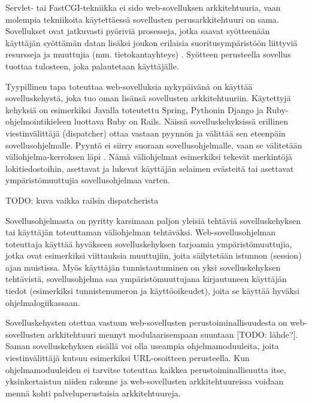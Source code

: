 Servlet- tai FastCGI-tekniikka ei sido web-sovelluksen arkkitehtuuria, vaan molempia tekniikoita käytettäessä sovellusten perusarkkitehtuuri on sama. Sovellukset ovat jatkuvasti pyöriviä prosesseja, jotka saavat syötteenään käyttäjän syöttämän datan lisäksi joukon erilaisia suoritusympäristöön liittyviä resursseja ja muuttujia (mm. tietokantayhteys) \cite{uml}. Syötteen perusteella sovellus tuottaa tulosteen, joka palautetaan käyttäjälle.

Tyypillinen tapa toteuttaa web-sovelluksia nykypäivänä on käyttää sovelluskehystä, joka tuo oman lisänsä sovellusten arkkitehtuuriin. Käytettyjä kehyksiä on esimerkiksi Javalla toteutettu Spring, Pythonin Django ja Ruby-ohjelmointikieleen luottava Ruby on Rails. Näissä sovelluskehyksissä erillinen viestinvälittäjä (dispatcher) ottaa vastaan pyynnön ja välittää sen eteenpäin sovellusohjelmalle. Pyyntö ei siirry suoraan sovellusohjelmalle, vaan se välitetään väliohjelma-kerroksen läpi \cite{ruby2011agile}. Nämä väliohjelmat esimerkiksi tekevät merkintöjä lokitiedostoihin, asettavat ja lukevat käyttäjän selaimen evästeitä tai asettavat ympäristömuuttujia sovellusohjelmaa varten.

TODO: kuva vaikka railsin dispatcherista

Sovellusohjelmasta on pyritty karsimaan paljon yleisiä tehtäviä sovelluskehyksen tai käyttäjän toteuttaman väliohjelman tehtäväksi. Web-sovellusohjelman toteuttaja käyttää hyväkseen sovelluskehyksen tarjoamia ympäristömuuttujia, jotka ovat esimerkiksi viittauksia muuttujiin, joita säilytetään istunnon (session) ajan muistissa. Myös käyttäjän tunnistautuminen on yksi sovelluskehyksen tehtävistä, sovellusohjelma saa ympäristömuuttujana kirjautuneen käyttäjän tiedot (esimerkiksi tunnistenumeron ja käyttöoikeudet), joita se käyttää hyväksi ohjelmalogiikassaan.

Sovelluskehysten otettua vastuun web-sovellusten perustoiminallisuudesta on web-sovellusten arkkitehtuuri mennyt modulaarisempaan suuntaan [TODO: lähde?]. Saman sovelluskehyksen sisällä voi olla useampia ohjelmamoduuleita, joita viestinvälittäjä kutsuu esimerkiksi URL-osoitteen perusteella. Kun ohjelmamoduuleiden ei tarvitse toteuttaa kaikkea perustoiminallisuutta itse, yksinkertaistuu niiden rakenne ja web-sovellusten arkkitehtuureissa voidaan mennä kohti palveluperustaisia arkkitehtuureja.